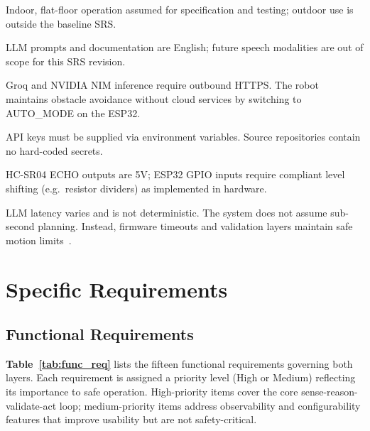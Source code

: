 \begin{description}[style=nextline]
  \item[Environment] Indoor, flat-floor operation assumed for specification and testing; outdoor use is outside the baseline SRS.

  \item[Language] LLM prompts and documentation are English; future speech modalities are out of scope for this SRS revision.

  \item[Network] Groq and NVIDIA NIM inference require outbound HTTPS. The robot maintains obstacle avoidance without cloud services by switching to AUTO\_MODE on the ESP32.

  \item[Credentials] API keys must be supplied via environment variables. Source repositories contain no hard-coded secrets.

  \item[Electrical] HC-SR04 ECHO outputs are 5V; ESP32 GPIO inputs require compliant level shifting (e.g.\ resistor dividers) as implemented in hardware.

  \item[Real-Time Bound] LLM latency varies and is not deterministic. The system does not assume sub-second planning. Instead, firmware timeouts and validation layers maintain safe motion limits~\cite{huang2023grounded}.
\end{description}

\section{Specific Requirements}
\label{sec:specific_req}

\subsection{Functional Requirements}
\label{subsec:func_req}

\textbf{Table~\ref{tab:func_req}} lists the fifteen functional requirements governing both layers. Each requirement is assigned a priority level (High or Medium) reflecting its importance to safe operation. High-priority items cover the core sense-reason-validate-act loop; medium-priority items address observability and configurability features that improve usability but are not safety-critical.

